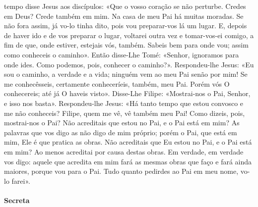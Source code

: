 \begin{paracol}{2}
{ tempo disse Jesus aos discípulos: «Que o vosso coração se não perturbe. Credes em Deus? Crede também em mim. Na casa de meu Pai há muitas moradas. Se não fora assim, já vo-lo tinha dito, pois vou preparar-vos lá um lugar. E, depois de haver ido e de vos preparar o lugar, voltarei outra vez e tomar-vos-ei comigo, a fim de que, onde estiver, estejais vós, também. Sabeis bem para onde vou; assim como conheceis o caminho». Então disse-Lhe Tomé: «Senhor, ignoramos para onde ides. Como podemos, pois, conhecer o caminho?». Respondeu-lhe Jesus: «Eu sou o caminho, a verdade e a vida; ninguém vem ao meu Pai senão por mim! Se me conhecêsseis, certamente conheceríeis, também, meu Pai. Porém vós O conhecereis; até já O haveis visto». Disse-Lhe Filipe: «Mostrai-nos o Pai, Senhor, e isso nos basta». Respondeu-lhe Jesus: «Há tanto tempo que estou convosco e me não conheceis? Filipe, quem me vê, vê também meu Pai! Como dizeis, pois, mostrai-nos o Pai? Não acreditais que estou no Pai, e o Pai está em mim? As palavras que vos digo as não digo de mim próprio; porém o Pai, que está em mim, Ele é que pratica as obras. Não acreditais que Eu estou no Pai, e o Pai está em mim? Ao menos acreditai por causa destas obras. Em verdade, em verdade vos digo: aquele que acredita em mim fará as mesmas obras que faço e fará ainda maiores, porque vou para o Pai. Tudo quanto pedirdes ao Pai em meu nome, vo-lo farei».
}\end{paracol}

\begin{paracol}{2}\switchcolumn{}\end{paracol}

\paragraph{Secreta}
\begin{paracol}{2}\switchcolumn{}\end{paracol}

